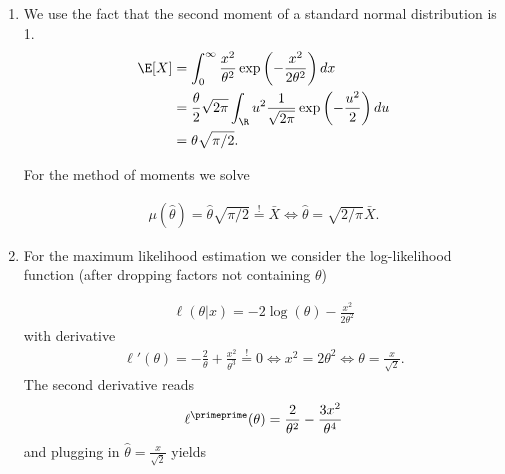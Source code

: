 \begin{solution}

\phantom{}

\begin{enumerate}[label = (\alph*)]
  \item We use the fact that the second moment of a standard normal distribution is 1.
  \begin{align*}
    \E[X] &= \int_0^{\infty} \frac{x^2}{\theta^2}\exp\left(-\frac{x^2}{2\theta^2}\right) dx \\
    &= \frac{\theta}{2}\sqrt{2\pi}\int_\R u^2\frac{1}{\sqrt{2\pi}}\exp\left(-\frac{u^2}{2}\right) du \\
    &= \theta\sqrt{\pi/2}.
  \end{align*}

  For the method of moments we solve

  \begin{align*}
    \mu(\hat{\theta}) = \hat{\theta}\sqrt{\pi/2} \stackrel{!}{=} \bar{X}
    \iff \hat{\theta} = \sqrt{2/\pi}\bar{X}.
  \end{align*}

  \item For the maximum likelihood estimation we consider the log-likelihood function
  (after dropping factors not containing $\theta$)

  \begin{align*}
    \ell(\theta|x) = -2\log(\theta) - \frac{x^2}{2\theta^2}
  \end{align*}
  with derivative
  \begin{align}
    \ell'(\theta) = -\frac{2}{\theta} + \frac{x^2}{\theta^3} \stackrel{!}{=} 0
    \iff x^2 = 2\theta^2 \iff \theta = \frac{x}{\sqrt{2}}.
  \end{align}
  The second derivative reads
  \begin{align*}
    \ell^{\primeprime}(\theta) = \frac{2}{\theta^2} - \frac{3x^2}{\theta^4}
  \end{align*}
  and plugging in $\hat{\theta} = \frac{x}{\sqrt{2}}$ yields


\end{enumerate}
\end{solution}
